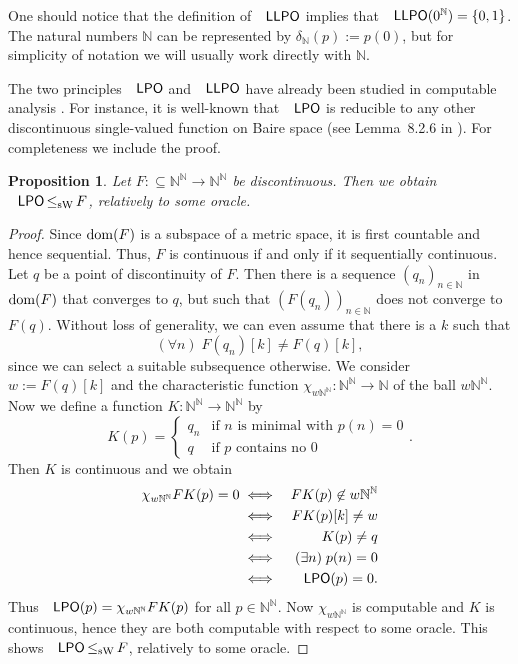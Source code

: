 \documentclass[jsl,10pt]{noasl}
\def\IN{{\mathbb{N}}}
\def\IS{{\mathbb{S}}}
\def\In{\subseteq}
\def\id{{\rm id}}
\def\dom{{\rm dom}}
\def\LPO{\text{\rm\sffamily LPO}}
\def\LLPO{\text{\rm\sffamily LLPO}}
\def\C{\text{\rm\sffamily C}}
\def\LPO{\text{\rm\sffamily LPO}}
\def\LLPO{\text{\rm\sffamily LLPO}}
\def\leqSW{\mathop{\leq_{\mathrm{sW}}}}
\newtheorem{proposition}{Proposition}[section]
\begin{document}
One should notice that the definition of $\LLPO$ implies that $\LLPO(0^\IN)=\{0,1\}$.
The natural numbers $\IN$ can be represented
by $\delta_\IN(p):=p(0)$, but for simplicity of notation we will usually work directly with $\IN$.


The two principles $\LPO$ and $\LLPO$ have already been studied in computable analysis \cite{Wei92a,Wei92c,Ste89,Myl92}.
For instance, it is well-known that $\LPO$ is reducible to any other discontinuous single-valued function
on Baire space (see Lemma~8.2.6 in \cite{Wei00}). For completeness we include the proof.

\begin{proposition}
\label{prop:discontinuous}
Let $F:\In\IN^\IN\to\IN^\IN$ be discontinuous. Then we obtain $\LPO\leqSW F$, relatively to some oracle.
\end{proposition}
\begin{proof}
Since $\dom(F)$ is a subspace of a metric space, it is first countable and hence sequential. 
Thus, $F$ is continuous if and only if it sequentially continuous.
Let $q$ be a point of discontinuity of $F$. Then there is a sequence $(q_n)_{n\in\IN}$
in $\dom(F)$ that converges to $q$, but such that $(F(q_n))_{n\in\IN}$ does not converge
to $F(q)$. Without loss of generality, we can even assume that there is a $k$ such that
\[(\forall n)\;F(q_n)[k]\not=F(q)[k],\]
since we can select a suitable subsequence otherwise.
We consider $w:=F(q)[k]$ and the characteristic function $\chi_{w\IN^\IN}:\IN^\IN\to\IN$
of the ball $w\IN^\IN$.
Now we define a function $K:\IN^\IN\to\IN^\IN$ by
\[K(p)=\left\{\begin{array}{ll}
q_n & \mbox{if $n$ is minimal with $p(n)=0$}\\
q   & \mbox{if $p$ contains no $0$}
\end{array}\right..\]
Then $K$ is continuous and we obtain
\begin{eqnarray*}
\chi_{w\IN^\IN}FK(p)=0
&\iff& FK(p)\not\in w\IN^\IN\\
&\iff& FK(p)[k]\not=w\\
&\iff& K(p)\not=q\\
&\iff& (\exists n)\;p(n)=0\\
&\iff& \LPO(p)=0.
\end{eqnarray*}
Thus $\LPO(p)=\chi_{w\IN^\IN}FK(p)$
for all $p\in\IN^\IN$. Now $\chi_{w\IN^\IN}$ is computable and $K$ is continuous,
hence they are both computable with respect to some oracle. 
This shows $\LPO\leqSW F$, relatively to some oracle.
\end{proof}
\end{document}
